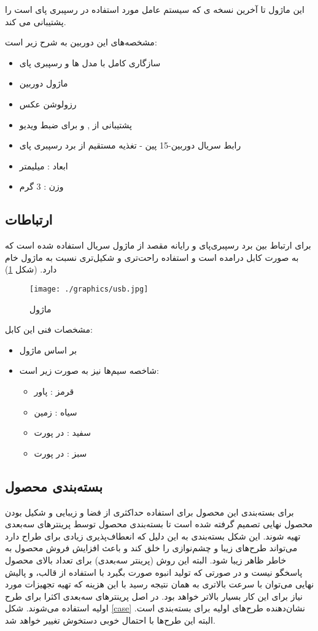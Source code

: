 \documentclass{article}
\begin{document}
این ماژول تا آخرین نسخه ی  که سیستم عامل مورد استفاده در رسپبری پای است را پشتیبانی می کند.

مشخصه‌های این دوربین به شرح زیر است:
\begin{itemize}
	\item سازگاری کامل با مدل ها  و  رسپبری پای
	\item ماژول دوربین 
	\item رزولوشن عکس 
	\item پشتیبانی از  ,  و   برای ضبط ویدیو
	\item رابط سریال دوربین-15 پین   - تغذیه مستقیم از برد رسپبری پای
	\item ابعاد :   میلیمتر
	\item وزن : 3 گرم
\end{itemize}		

\subsection{ارتباطات}
برای ارتباط بین برد رسپبری‌پای و رایانه مقصد از ماژول سریال  استفاده
شده است که به صورت کابل درامده است و استفاده راحت‌تری و شکیل‌تری نسبت به ماژول خام دارد.
(شکل \ref{usb})

\begin{figure}
	\centering
	\texttt{[image: ./graphics/usb.jpg]}
	\caption{ماژول }
	\label{usb}
\end{figure}

 مشخصات فنی این کابل:
 \begin{itemize}
 	\item بر اساس ماژول 
 	\item شاخصه‌ سیم‌ها نیز به صورت زیر است:
 	\begin{itemize}[*]
 		\item قرمز : پاور
 		\item سیاه : زمین
 		\item سفید :  در پورت 
 		\item سبز :   در پورت 
 	\end{itemize}
 \end{itemize}

\subsection{بسته‌بندی محصول}
برای بسته‌بندی این محصول برای استفاده حداکثری از فضا و زیبایی و شکیل بودن محصول نهایی تصمیم
گرفته شده است تا بسته‌بندی محصول توسط پرینترهای سه‌بعدی تهیه شوند. این شکل بسته‌بندی به این دلیل که انعطاف‌پذیری زیادی برای طراح دارد می‌تواند طرح‌های زیبا و چشم‌نوازی را خلق کند و باعث
افزایش فروش محصول به خاطر ظاهر زیبا شود. البته این روش (پرینتر سه‌بعدی) برای تعداد بالای
محصول پاسخگو نیست و در صورتی که تولید انبوه صورت بگیرد با استفاده از قالب، و پالیش نهایی
می‌توان با سرعت بالاتری به همان نتیجه رسید با این هزینه که تهیه تجهیزات مورد نیاز برای این
کار بسیار بالاتر خواهد بود. در اصل پرینترهای سه‌بعدی اکثرا برای طرح اولیه استفاده می‌شوند. شکل \ref{case} نشان‌دهنده طرح‌های اولیه برای بسته‌بندی است. البته این طرح‌ها با احتمال خوبی دستخوش تغییر خواهد شد.
\end{document}
